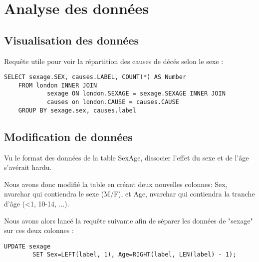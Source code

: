 \chapter{Analyse des données}

\section{Visualisation des données}

Requête utile pour voir la répartition des causes de décés selon le sexe :

\begin{lstlisting}[frame=single]
    SELECT sexage.SEX, causes.LABEL, COUNT(*) AS Number
    FROM london INNER JOIN
            sexage ON london.SEXAGE = sexage.SEXAGE INNER JOIN
            causes on london.CAUSE = causes.CAUSE
    GROUP BY sexage.sex, causes.label
\end{lstlisting}

\section{Modification de données}

    Vu le format des données de la table SexAge, dissocier l'effet du sexe et de l'âge s'avérait hardu.

    Nous avons donc modifié la table en créant deux nouvelles colonnes: Sex, nvarchar qui contiendra le sexe (M/F), et Age,
    nvarchar qui contiendra la tranche d'âge (<1, 10-14, ...).

    Nous avons alors lancé la requête suivante afin de séparer les données de "sexage" sur ces deux colonnes :

    \begin{lstlisting}[frame=single]
        UPDATE sexage
        SET Sex=LEFT(label, 1), Age=RIGHT(label, LEN(label) - 1);
    \end{lstlisting}